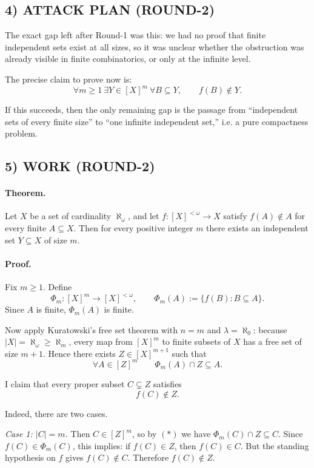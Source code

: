 \subsection*{4) ATTACK PLAN (ROUND-2)}

The exact gap left after Round-1 was this: we had no proof that finite independent sets exist at all sizes,
so it was unclear whether the obstruction was already visible in finite combinatorics, or only at the
infinite level.

The precise claim to prove now is:
\[
\forall m\ge 1\ \exists Y\in [X]^m\ \forall B\subseteq Y,\qquad f(B)\notin Y.
\]

If this succeeds, then the only remaining gap is the passage from ``independent sets of every finite
size'' to ``one infinite independent set,'' i.e. a pure compactness problem.

\subsection*{5) WORK (ROUND-2)}

\paragraph{Theorem.}
Let $X$ be a set of cardinality $\aleph_\omega$, and let
$f:[X]^{<\omega}\to X$ satisfy $f(A)\notin A$ for every finite $A\subseteq X$.
Then for every positive integer $m$ there exists an independent set $Y\subseteq X$ of size $m$.

\paragraph{Proof.}
Fix $m\ge 1$.
Define
\[
\Phi_m:[X]^m\to [X]^{<\omega},\qquad
\Phi_m(A):=\{f(B):B\subseteq A\}.
\]
Since $A$ is finite, $\Phi_m(A)$ is finite.

Now apply Kuratowski's free set theorem with $n=m$ and $\lambda=\aleph_0$:
because $|X|=\aleph_\omega\ge \aleph_m$, every map from $[X]^m$ to finite subsets of $X$
has a free set of size $m+1$.
Hence there exists $Z\in [X]^{m+1}$ such that
\[
\forall A\in [Z]^m\qquad \Phi_m(A)\cap Z\subseteq A.
\tag{$*$}
\]

I claim that every proper subset $C\subsetneq Z$ satisfies
\[
f(C)\notin Z.
\tag{$**$}
\]

Indeed, there are two cases.

\smallskip

\emph{Case 1: $|C|=m$.}
Then $C\in [Z]^m$, so by $(*)$ we have $\Phi_m(C)\cap Z\subseteq C$.
Since $f(C)\in \Phi_m(C)$, this implies:
if $f(C)\in Z$, then $f(C)\in C$.
But the standing hypothesis on $f$ gives $f(C)\notin C$.
Therefore $f(C)\notin Z$.

